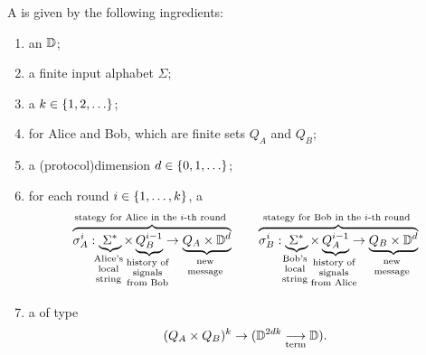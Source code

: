 \begin{definition}\label{def:two-party-protocol-general} A 
   is given by the following ingredients: 
  \begin{enumerate}
    \item an  $\mathbb D$;
    \item a finite input alphabet $\Sigma$;
    \item a  $k \in \{1,2,\ldots\}$;
    \item {} for Alice and Bob, which are finite sets $Q_A$ and $Q_B$;
    \item a \intro(protocol){dimension} $d \in \{0,1,\ldots\}$;
    \item for each round $i \in \{1,\ldots,k\}$, a 
    \begin{align*}
    \myoverbrace{\sigma_A^i : \myunderbrace{\Sigma^*}{Alice's \\ local\\ string} \times \myunderbrace{Q_B^{i-1}}{history of \\ signals \\ from Bob}  \to \myunderbrace{Q_A \times \domain^d}{new\\ message}}{stategy for Alice in the $i$-th round}
    \qquad 
        \myoverbrace{\sigma_B^i : \myunderbrace{\Sigma^*}{Bob's \\ local\\ string} \times \myunderbrace{Q_A^{i-1}}{history of \\ signals \\ from Alice}  \to \myunderbrace{Q_B \times \domain^d}{new\\ message}}{stategy for Bob in the $i$-th round}
    \end{align*}
    \item a  of type \begin{align*}
    (Q_A \times Q_B)^{k} \to (\mathbb D^{2dk} \underset{\text{term}}{\longrightarrow} \mathbb D).
    \end{align*}
  \end{enumerate}
\end{definition}




